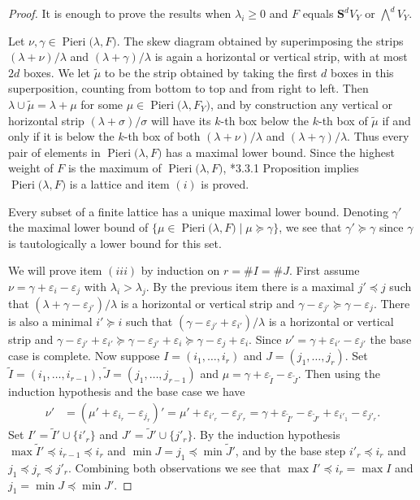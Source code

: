 \documentclass[11pt,fleqn]{amsart}
\renewcommand\epsilon{\varepsilon}
\theoremstyle{definition}
\theoremstyle{remark}
\theoremstyle{remark}
\renewcommand\SS{\mathbf S}
\newcommand\Pieri[2]{\operatorname{Pieri}{(#1},{#2)}}
\begin{document}
\begin{proof}
It is enough to prove the results when $\lambda_i \geq 0$ and $F$ equals 
$\SS^d V_Y$ or $\bigwedge^d V_Y$. 

Let $\nu, \gamma \in \Pieri{\lambda}{F}$. The skew diagram obtained by
superimposing the strips $(\lambda + \nu)/\lambda$ and $(\lambda + \gamma) / 
\lambda$ is again a horizontal or vertical strip, with at most $2d$ boxes. We 
let $\tilde \mu$ to be the strip obtained by taking the first $d$ boxes in this 
superposition, counting from bottom to top and from right to left. Then 
$\lambda \cup \tilde\mu = \lambda + \mu$ for some $\mu \in \Pieri{\lambda}
{F_Y}$, and by construction any vertical or horizontal strip $(\lambda + 
\sigma)/\sigma$ will have its $k$-th box below the $k$-th box of $\tilde \mu$
if and only if it is below the $k$-th box of both $(\lambda + \nu)/\lambda$
and $(\lambda + \gamma)/\lambda$. Thus every pair of elements in 
$\Pieri{\lambda}{F}$ has a maximal lower bound. Since the highest weight of $F$ 
is the maximum of $\Pieri{\lambda}{F}$, \cite{StanleyI}*{3.3.1 Proposition}
implies $\Pieri{\lambda}{F}$ is a lattice and item $(i)$ is proved. 

Every subset of a finite lattice has a unique maximal lower bound. Denoting 
$\gamma'$ the maximal lower bound of $\{\mu \in \Pieri{\lambda}{F} \mid \mu 
\succeq \gamma\}$, we see that $\gamma' \succeq \gamma$ since $\gamma$ is tautologically a lower bound for this set. 

We will prove item $(iii)$ by induction on $r = \# I = \#J$. First assume $\nu 
= \gamma + \epsilon_i - \epsilon_j$ with $\lambda_i > \lambda_j$. By the 
previous item there is a maximal $j' \preceq j$ such that $(\lambda + \gamma - 
\epsilon_{j'})/\lambda$ is a horizontal or vertical strip and $\gamma - 
\epsilon_{j'} \succeq \gamma - \epsilon_j$. There is also a minimal $i' 
\succeq i$ such that $(\gamma - \epsilon_{j'} + \epsilon_{i'})/\lambda$ is a 
horizontal or vertical strip and $\gamma - \epsilon_{j'} + \epsilon_{i'} \succeq 
\gamma - \epsilon_{j'} + \epsilon_i \succeq \gamma - \epsilon_j + \epsilon_i$. 
Since $\nu' = \gamma + \epsilon_{i'} - \epsilon_{j'}$ the base case is complete.
Now suppose $I = (i_1, \ldots, i_r)$ and $J = (j_1, \ldots, j_r)$. Set $\tilde I
= (i_1, \ldots, i_{r-1}), \tilde J = (j_1, \ldots, j_{r-1})$ and $\mu = \gamma 
+ \epsilon_{\tilde I} - \epsilon_{\tilde J}$. Then using the induction
hypothesis and the base case we have
\begin{align*}
  \nu' 
    &= (\mu' + \epsilon_{i_r} - \epsilon_{j_r})'
    = \mu' + \epsilon_{i'_r} - \epsilon_{j'_r}
    = \gamma + \epsilon_{\tilde I'} - \epsilon_{\tilde J'} + \epsilon_{i'_1} - 
    \epsilon_{j'_r}.
\end{align*} 
Set $I' = \tilde I' \cup \{i'_r\} $ and $J' = \tilde J' \cup \{j'_r\}$. By the 
induction hypothesis $\max \tilde I' \preceq i_{r-1} \preceq i_r$ and $\min J
= j_1 \preceq \min \tilde J'$, and by the base step $i'_r \preceq i_r$ and $j_1 
\preceq j_r \preceq j'_r$. Combining both observations we see that $\max I' 
\preceq i_r = \max I$ and $j_1 = \min J \preceq \min J'$.
\end{proof}
\end{document}
